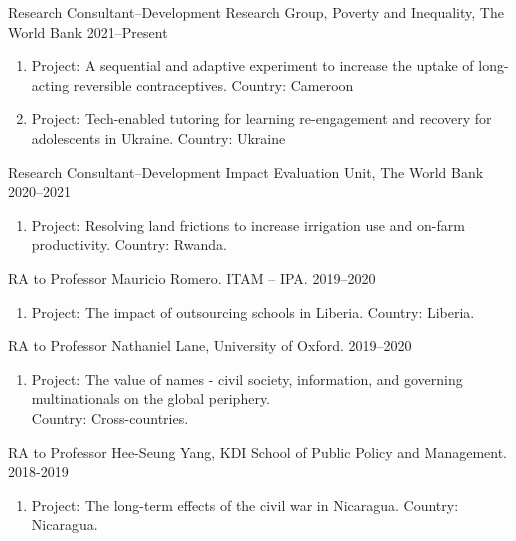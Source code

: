\documentclass[a4paper, 10pt]{article}
\renewenvironment{itemize}{
  \begin{list}{}
    { \setlength{\itemsep}{5pt}
      \setlength{\parsep}{0pt}
      \setlength{\topsep}{0pt}
      \setlength{\leftmargin}{0em} } }{
  \end{list}}
\begin{document}
\begin{itemize}
  \item Research Consultant--Development Research Group, Poverty and Inequality, The World Bank \hfill 2021--Present 
  \begin{enumerate}[leftmargin=10pt, label={}, nosep]
    \item {\small Project: A sequential and adaptive experiment to increase the uptake of long-acting reversible contraceptives. \newline 
    Country: Cameroon} 
    \item {\small Project: Tech-enabled tutoring for learning re-engagement and recovery for adolescents in Ukraine. \newline 
    Country: Ukraine}
  \end{enumerate}
  \item Research Consultant--Development Impact Evaluation Unit, The World Bank \hfill 2020--2021 
  \begin{enumerate}[leftmargin=10pt, label={}, nosep]  
    \item {\small Project: Resolving land frictions to increase irrigation use and on-farm productivity. \newline Country: Rwanda.}
  \end{enumerate}
  \item RA to Professor Mauricio Romero. ITAM -- IPA. \hfill 2019--2020  
  \begin{enumerate}[leftmargin=10pt, label={}, nosep]  
    \item {\small Project: The impact of outsourcing schools in Liberia. \newline Country: Liberia.}
  \end{enumerate}
  \item RA to Professor Nathaniel Lane, University of Oxford. \hfill 2019--2020  
  \begin{enumerate}[leftmargin=10pt, label={}, nosep]  
    \item {\small Project: The value of names - civil society, information, and governing multinationals on the global periphery. \\ Country: Cross-countries.}
  \end{enumerate}
  \item RA to Professor Hee-Seung Yang, KDI School of Public Policy and Management. \hfill 2018-2019  
  \begin{enumerate}[leftmargin=10pt, label={}, nosep]  
    \item {\small Project: The long-term effects of the civil war in Nicaragua. \newline Country: Nicaragua.}
  \end{enumerate}
\end{itemize}
\end{document}

